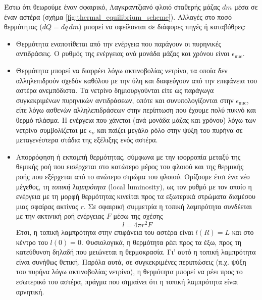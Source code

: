 Έστω ότι θεωρούμε έναν σφαιρικό, Λαγκραντζιανό φλοιό σταθερής μάζας $dm$ μέσα σε έναν αστέρα (σχήμα \ref{fig:thermal_equilibrium_scheme}). Αλλαγές στο ποσό θερμότητας ($dQ = dq \,dm$) μπορεί να οφείλονται σε διάφορες πηγές ή καταβόθρες:
\begin{itemize}
    \item Θερμότητα εναποτίθεται από την ενέργεια που παράγουν οι πυρηνικές αντιδράσεις. Ο ρυθμός της ενέργειας ανά μονάδα μάζας και χρόνου είναι $\epsilon_{\text{nuc}}$.
    \item Θερμότητα μπορεί να διαρρέει λόγω ακτινοβολίας νετρίνο, τα οποία δεν αλληλεπιδρούν σχεδόν καθόλου με την ύλη και διαφεύγουν από την επιφάνεια του αστέρα ανεμπόδιστα. Τα νετρίνο δημιουργούνται είτε ως παράγωγα συγκεκριμένων πυρηνικών αντιδράσεων, οπότε και συνυπολογίζονται στην $\epsilon_{\text{nuc}}$, είτε λόγω ασθενών αλληλεπιδράσεων στην περίπτωση που έχουμε πολύ πυκνό και θερμό πλάσμα. Η ενέργεια που χάνεται (ανά μονάδα μάζας και χρόνου) λόγω των νετρίνο συμβολίζεται με $\epsilon_\nu$ και παίζει μεγάλο ρόλο στην ψύξη του πυρήνα σε μεταγενέστερα στάδια της εξέλιξης ενός αστέρα.
    \item Απορρόφηση ή εκπομπή θερμότητας, σύμφωνα με την ισορροπία μεταξύ της θεμικής ροή που εισέρχεται στο κατώτερο μέρος του φλοιού και της θερμικής ροής που εξέρχεται από το ανώτερο στρώμα του φλοιού. Ορίζουμε έτσι ένα νέο μέγεθος, τη \textit{τοπική λαμπρότητα} (local luminosity), ως τον ρυθμό με τον οποίο η ενέργεια με τη μορφή θερμότητας κινείται προς τα εξωτερικά στρώματα διαμέσου μιας σφαίρας ακτίνας $r$. Σε σφαιρική συμμετρία η τοπική λαμπρότητα συνδέεται με την ακτινική ροή ενέργειας $F$ μέσω της σχέσης
    \begin{equation}
        \label{eq:local_luminosity}
        l = 4\pi r^2 F
    \end{equation}
    Έτσι, η τοπική λαμπρότητα στην επιφάνεια του αστέρα είναι $l(R) = L$ και στο κέντρο του $l(0) = 0$. Φυσιολογικά, η θερμότητα ρέει προς τα έξω, προς τη κατεύθυνση δηλαδή που μειώνεται η θερμοκρασία. Γι' αυτό η τοπική λαμπρότητα είναι συνήθως θετική. Παρόλα αυτά, σε συγκεκριμένες περιπτώσεις (π.χ. ψύξη του πυρήνα λόγω ακτινοβολίας νετρίνο), η θερμότητα μπορεί να ρέει προς το εσωτερικό του αστέρα, πράγμα που σημαίνει ότι η τοπική λαμπρότητα είναι αρνητική.
\end{itemize}

